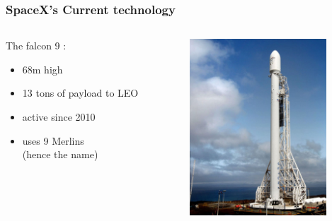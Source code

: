 {\begin{frame}
    \frametitle{SpaceX's Current technology}
    \begin{columns}
        \begin{column}{60mm}
            The falcon 9 :\\
            \vspace{1em}
            \begin{itemize}
                \item 68m high
                \item 13 tons of payload to LEO
                \item active since 2010
                \item uses 9 Merlins \\(hence the name)
            \end{itemize}
        \end{column}
        \begin{column}{50mm}
\includegraphics[height=66mm]{images/falcon9}
        \end{column}
    \end{columns}
\end{frame}

}
